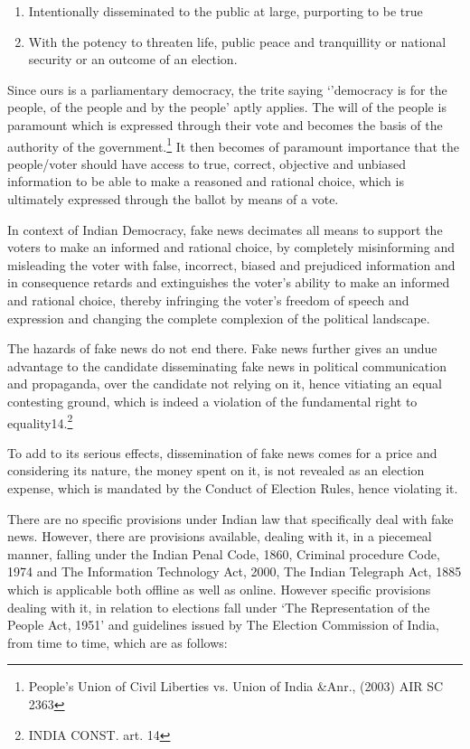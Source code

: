 \begin{multicols}{2}
\begin{enumerate}
\item Intentionally disseminated to the public at large, purporting to be true 

\item With the potency to threaten life, public peace and tranquillity or national security or
an outcome of an election.
\end{enumerate}


Since ours is a parliamentary democracy, the trite saying ‘’democracy is for the people, of the
people and by the people’ aptly applies. The will of the people is paramount which is
expressed through their vote and becomes the basis of the authority of the 
government.\footnote{People's Union of Civil Liberties vs. Union of India &Anr., (2003) AIR SC 2363} It
then becomes of paramount importance that the people/voter should have access to true,
correct, objective and unbiased information to be able to make a reasoned and rational choice,
which is ultimately expressed through the ballot by means of a vote.

In context of Indian Democracy, fake news decimates all means to support the voters to make
an informed and rational choice, by completely misinforming and misleading the voter with
false, incorrect, biased and prejudiced information and in consequence retards and
extinguishes the voter’s ability to make an informed and rational choice, thereby infringing
the voter’s freedom of speech and expression and changing the complete complexion of the
political landscape.

The hazards of fake news do not end there. Fake news further gives an undue advantage to
the candidate disseminating fake news in political communication and propaganda, over the 
candidate not relying on it, hence vitiating an equal contesting ground, which is indeed a
violation of the fundamental right to equality14.\footnote{INDIA CONST. art. 14} 

To add to its serious effects, dissemination of fake news comes for a price and considering its
nature, the money spent on it, is not revealed as an election expense, which is mandated by
the Conduct of Election Rules, hence violating it.


There are no specific provisions under Indian law that specifically deal with fake news.
However, there are provisions available, dealing with it, in a piecemeal manner, falling under
the Indian Penal Code, 1860, Criminal procedure Code, 1974 and The Information
Technology Act, 2000, The Indian Telegraph Act, 1885 which is applicable both offline as
well as online. However specific provisions dealing with it, in relation to elections fall under
‘The Representation of the People Act, 1951’ and guidelines issued by The Election
Commission of India, from time to time, which are as follows:


\end{multicols}

